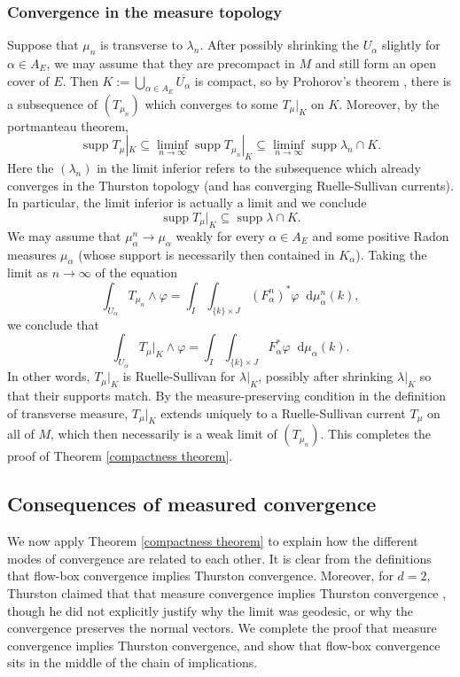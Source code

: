 \documentclass[reqno,11pt]{amsart}
\newcommand*\dif{\mathop{}\!\mathrm{d}}
\DeclareMathOperator{\supp}{supp}
\theoremstyle{definition}
\numberwithin{equation}{section}
\begin{document}
\subsubsection{Convergence in the measure topology}
Suppose that $\mu_n$ is transverse to $\lambda_n$.
After possibly shrinking the $U_\alpha$ slightly for $\alpha \in A_E$, we may assume that they are precompact in $M$ and still form an open cover of $E$.
Then $K := \bigcup_{\alpha \in A_E} \overline{U_\alpha}$ is compact, so by Prohorov's theorem \cite[Theorem 13.29]{klenke2013probability}, there is a subsequence of $(T_{\mu_n})$ which converges to some $T_\mu|_K$ on $K$.
Moreover, by the portmanteau theorem,
$$\supp T_\mu|_K \subseteq \liminf_{n \to \infty} \supp T_{\mu_n}|_K \subseteq \liminf_{n \to \infty} \supp \lambda_n \cap K.$$
Here the $(\lambda_n)$ in the limit inferior refers to the subsequence which already converges in the Thurston topology (and has converging Ruelle-Sullivan currents).
In particular, the limit inferior is actually a limit and we conclude
$$\supp T_\mu|_K \subseteq \supp \lambda \cap K.$$
We may assume that $\mu_\alpha^n \to \mu_\alpha$ weakly for every $\alpha \in A_E$ and some positive Radon measures $\mu_\alpha$ (whose support is necessarily then contained in $K_\alpha$).
Taking the limit as $n \to \infty$ of the equation 
$$\int_{U_\alpha} T_{\mu_n} \wedge \varphi = \int_I \int_{\{k\} \times J} (F_\alpha^n)^* \varphi \dif \mu_\alpha^n(k),$$
we conclude that
$$\int_{U_\alpha} T_\mu|_K \wedge \varphi = \int_I \int_{\{k\} \times J} F_\alpha^* \varphi \dif \mu_\alpha(k).$$
In other words, $T_\mu|_K$ is Ruelle-Sullivan for $\lambda|_K$, possibly after shrinking $\lambda|_K$ so that their supports match.
By the measure-preserving condition in the definition of transverse measure, $T_\mu|_K$ extends uniquely to a Ruelle-Sullivan current $T_\mu$ on all of $M$, which then necessarily is a weak limit of $(T_{\mu_n})$.
This completes the proof of Theorem \ref{compactness theorem}.


\subsection{Consequences of measured convergence}
We now apply Theorem \ref{compactness theorem} to explain how the different modes of convergence are related to each other.
It is clear from the definitions that flow-box convergence implies Thurston convergence.
Moreover, for $d = 2$, Thurston claimed that that measure convergence implies Thurston convergence \cite[Proposition 8.10.3]{thurston1979geometry}, though he did not explicitly justify why the limit was geodesic, or why the convergence preserves the normal vectors.
We complete the proof that measure convergence implies Thurston convergence, and show that flow-box convergence sits in the middle of the chain of implications.
\end{document}
